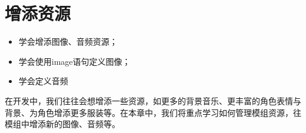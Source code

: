 \chapter{增添资源}
\begin{ChapterGoals}
    \begin{itemize}
        \item 学会增添图像、音频资源；
        \item 学会使用image语句定义图像；
        \item 学会定义音频
    \end{itemize}
\end{ChapterGoals}

在开发中，我们往往会想增添一些资源，如更多的背景音乐、更丰富的角色表情与背景、为角色增添更多服装等。在本章中，我们将重点学习如何管理模组资源，往模组中增添新的图像、音频等。

